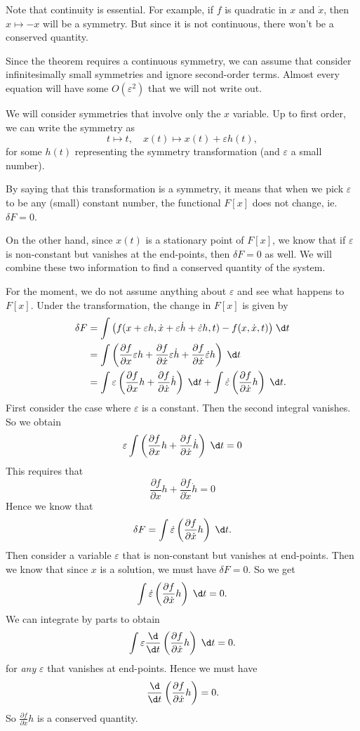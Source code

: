 \documentclass[a4paper]{article}
\begin{document}
Note that continuity is essential. For example, if $f$ is quadratic in $x$ and $\dot{x}$, then $x\mapsto -x$ will be a symmetry. But since it is not continuous, there won't be a conserved quantity.

Since the theorem requires a continuous symmetry, we can assume that consider infinitesimally small symmetries and ignore second-order terms. Almost every equation will have some $O(\varepsilon^2)$ that we will not write out.

We will consider symmetries that involve only the $x$ variable. Up to first order, we can write the symmetry as
\[
  t \mapsto t,\quad x(t)\mapsto x(t) + \varepsilon h(t),
\]
for some $h(t)$ representing the symmetry transformation (and $\varepsilon$ a small number).

By saying that this transformation is a symmetry, it means that when we pick $\varepsilon$ to be any (small) constant number, the functional $F[x]$ does not change, ie. $\delta F = 0$.

On the other hand, since $x(t)$ is a stationary point of $F[x]$, we know that if $\varepsilon$ is non-constant but vanishes at the end-points, then $\delta F = 0$ as well. We will combine these two information to find a conserved quantity of the system.

For the moment, we do not assume anything about $\varepsilon$ and see what happens to $F[x]$. Under the transformation, the change in $F[x]$ is given by
\begin{align*}
  \delta F &= \int \big(f(x + \varepsilon h, \dot{x} + \varepsilon \dot{h} + \dot{\varepsilon} h, t) - f(x, \dot{x}, t)\big)\;\d t\\
  &= \int\left(\frac{\partial f}{\partial x}\varepsilon h + \frac{\partial f}{\partial \dot{x}}\varepsilon \dot{h} + \frac{\partial f}{\partial \dot{x}}\dot{\varepsilon} h\right)\;\d t\\
  &= \int \varepsilon\left(\frac{\partial f}{\partial x}h + \frac{\partial f}{\partial \dot{x}}\dot{h}\right)\;\d t + \int \dot{\varepsilon} \left(\frac{\partial f}{\partial \dot{x}}h\right)\;\d t.
\end{align*}
First consider the case where $\varepsilon$ is a constant. Then the second integral vanishes. So we obtain
\[
  \varepsilon \int \left(\frac{\partial f}{\partial x}h + \frac{\partial f}{\partial\dot{x}}\dot{h}\right)\;\d t = 0
\]
This requires that
\[
  \frac{\partial f}{\partial x}h + \frac{\partial f}{\partial\dot{x}}\dot{h} = 0
\]
Hence we know that
\[
  \delta F = \int\dot{\varepsilon}\left(\frac{\partial f}{\partial \dot{x}}h\right)\;\d t.
\]
Then consider a variable $\varepsilon$ that is non-constant but vanishes at end-points. Then we know that since $x$ is a solution, we must have $\delta F = 0$. So we get
\[
  \int\dot{\varepsilon}\left(\frac{\partial f}{\partial \dot{x}}h\right)\;\d t = 0.
\]
We can integrate by parts to obtain
\[
  \int \varepsilon \frac{\d}{\d t}\left(\frac{\partial f}{\partial \dot{x}}h\right)\;\d t = 0.
\]
for \emph{any} $\varepsilon$ that vanishes at end-points. Hence we must have
\[
  \frac{\d}{\d t}\left(\frac{\partial f}{\partial \dot{x}}h\right) = 0.
\]
So $\frac{\partial f}{\partial \dot{x}}h$ is a conserved quantity.
\end{document}
